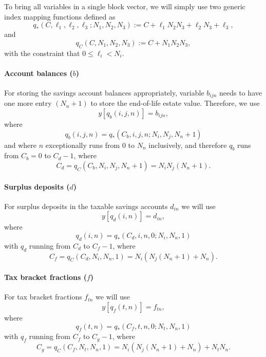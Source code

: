 \documentclass{report}[fleqn,11pt]
\begin{document}
To bring all variables in a single block vector,
we will simply use two generic index mapping functions defined as
\begin{equation}
	q_*(C, \ell_1, \ell_2, \ell_3 ; N_1, N_2, N_3) :=
	C + \ell_1N_2N_3 + \ell_2N_3 + \ell_3 ,
\end{equation}
and
\begin{equation}
	q_C(C, N_1, N_2, N_3) :=
	C + N_1N_2N_3,
\end{equation}
with the constraint that $0 \le \ell_i < N_i$.

\paragraph*{Account balances (\boldmath$b$)}
For storing the savings account balances appropriately, variable $b_{ijn}$ needs to have one
more entry $(N_n + 1)$ to
store the end-of-life estate value. Therefore, we use
\begin{equation}
	y[q_b(i, j, n)] = b_{ijn},
\end{equation}
where
\begin{equation}
	\label{Eq:Extra}
	q_b(i, j, n) = q_*(C_b, i, j, n; N_i, N_j, N_n+1)
\end{equation}
and where $n$ exceptionally runs from 0 to $N_n$ inclusively, and therefore
$q_b$ runs from $C_b = 0$ to $C_{d} - 1$,
where
\[
	C_{d} = q_C(C_b, N_i, N_j, N_n+1) = N_i N_j (N_n+1).
\]

\paragraph*{Surplus deposits (\boldmath$d$)}
For surplus deposits in the taxable savings accounts $d_{in}$ we will use
\begin{equation}
	y[q_d(i, n)] = d_{in},
\end{equation}
where
\begin{equation}
	q_d(i, n) = q_*(C_d, i, n, 0; N_i, N_n, 1)
\end{equation}
with $q_d$ running from $C_d$ to $C_f - 1$, where
\[
	C_f = q_C(C_d, N_i, N_n, 1) = N_i(N_j(N_n+1) + N_n).
\]

\paragraph*{Tax bracket fractions (\boldmath$f$)}
For tax bracket fractions $f_{t n}$ we will use
\begin{equation}
	y[q_f(t, n)] = f_{t n},
\end{equation}
where
\begin{equation}
	q_f(t, n) = q_*(C_f, t, n, 0; N_t, N_n, 1)
\end{equation}
with $q_f$ running from $C_f$ to $C_g - 1$, where
\[
	C_g = q_C(C_f, N_t, N_n, 1) = N_i(N_j(N_n+1) + N_n) + N_tN_n.
\]
\end{document}
